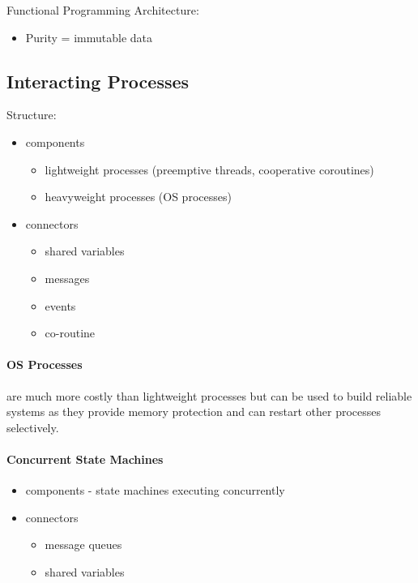 \documentclass{article}
\begin{document}
Functional Programming Architecture:
\begin{itemize}
    \item Purity = immutable data
\end{itemize}
\subsection*{Interacting Processes} %
\label{sub:interacting_processes}
Structure:
\begin{itemize}
    \item components
    \begin{itemize}
        \item lightweight processes (preemptive threads, cooperative coroutines)
        \item heavyweight processes (OS processes)
    \end{itemize}
    \item connectors
    \begin{itemize}
        \item shared variables
        \item messages
        \item events
        \item co-routine
    \end{itemize}
\end{itemize}

\paragraph{OS Processes} %
\label{par:os_processes}
are much more costly than lightweight processes but can be used to build reliable systems as they provide memory protection and can restart other processes selectively.

\paragraph{Concurrent State Machines} %
\label{par:concurrent_state_machines}
\begin{itemize}
    \item components - state machines executing concurrently
    \item connectors
    \begin{itemize}
        \item message queues
        \item shared variables
    \end{itemize}
\end{itemize}
\end{document}
